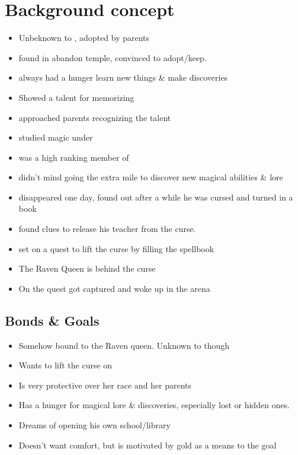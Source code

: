     \section{Background concept}
    \begin{itemize}
        \item Unbeknown to \Name{}, adopted by parents
        \item \Mom{} found \Name{} in abandon temple, convinced \Dad{} to adopt/keep.
        \item \Name{} always had a hunger learn new things \& make discoveries
        \item \Name{} Showed a talent for memorizing
        \item \MasterFullName{} approached parents recognizing the talent
        \item \Name{} studied magic under \Master{}
        \item \Master{} was a high ranking member of \CloisterIntro{}
        \item \Name{} didn't mind going the extra mile to discover new magical abilities \& lore
        \item \Master disappeared one day, \Name{} found out after a while he was cursed and turned in a book
        \item \Name{} found clues to release his teacher from the curse.
        \item \Name{} set on a quest to lift the curse by filling the spellbook
        \item The Raven Queen is behind the curse
        \item On the quest \Name{} got captured and woke up in the arena
      \end{itemize}
      

    \subsection{Bonds \& Goals}
    \begin{itemize}
        \item Somehow bound to the Raven queen. Unknown to \Name{} though
        \item Wants to lift the curse on \MasterFullName{}
        \item Is very protective over her race and her parents
        \item Has a hunger for magical lore \& discoveries, especially lost or hidden ones.
        \item Dreams of opening his own school/library
        \item Doesn't want comfort, but is motivated by gold as a means to the goal
    \end{itemize}

